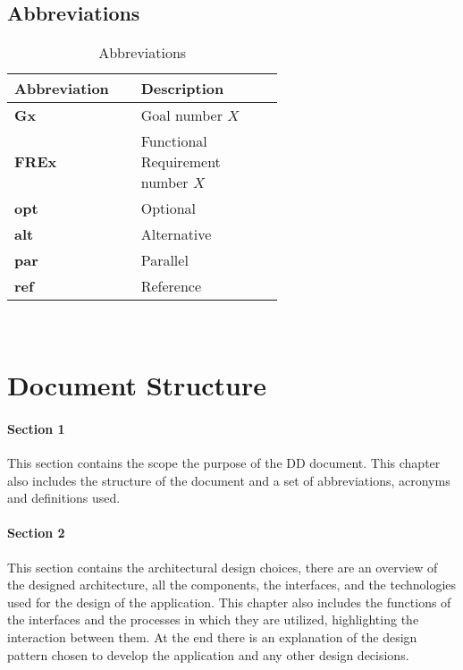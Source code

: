 \subsection{Abbreviations} %
\label{subsec:abbreviations}
\begin{table}[H]
\centering 
    \begin{tabular}{| p{0.2\linewidth} | p{0.4\linewidth} |}
    \hline
    \rowcolor{bluepoli!40}
     \textbf{Abbreviation} & \textbf{Description} \T\B \\
    \hline \hline
    \textbf{Gx} & Goal number $X$\T\B\\
    \hline
    \textbf{FREx} & Functional Requirement number $X$\T\B\\
    \hline
    \textbf{opt} & Optional \T\B\\
    \hline
    \textbf{alt} & Alternative  \T\B\\
    \hline       
    \textbf{par} & Parallel \T\B\\
    \hline   
    \textbf{ref} & Reference \T\B\\
    \hline   
    \end{tabular}
    \\[10pt]
    \caption{Abbreviations}
\end{table}
\newpage
\section{Document Structure}
\label{sec:documentStructure}
\paragraph{Section 1}
This section contains the scope the purpose of the DD
document. This chapter also includes the structure of the document and a set of abbreviations, acronyms and definitions used.
\paragraph{Section 2}
This section contains the architectural design choices, there are an overview of the designed architecture, all the components,
the interfaces, and the technologies used for the design of the application. This chapter also includes the functions of the interfaces and the processes in which they are utilized, highlighting the interaction between them. At the end there is an explanation of the design pattern chosen to develop the application and any other design decisions.
